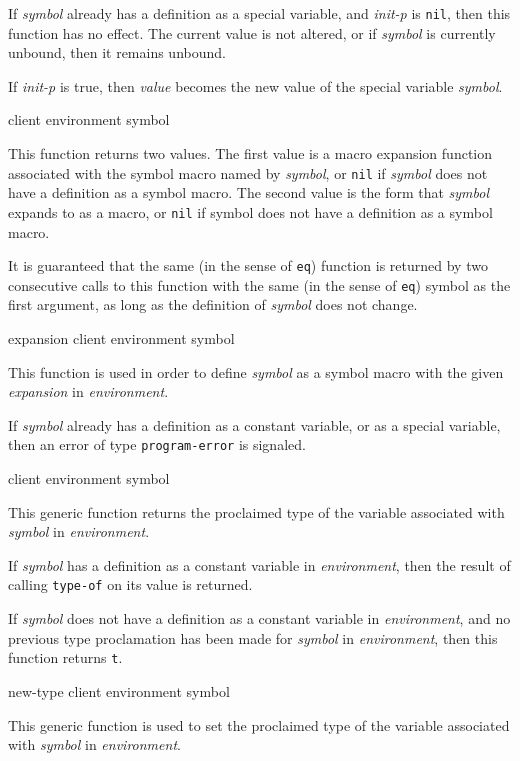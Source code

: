 If \textit{symbol} already has a definition as a special variable, and
\textit{init-p} is \texttt{nil}, then this function has no effect.
The current value is not altered, or if \textit{symbol} is currently
unbound, then it remains unbound.

If \textit{init-p} is true, then \textit{value} becomes the new value
of the special variable \textit{symbol}.

 {client environment symbol}

This function returns two values.  The first value is a macro
expansion function associated with the symbol macro named by
\textit{symbol}, or \texttt{nil} if \textit{symbol} does not have a
definition as a symbol macro.  The second value is the form that
\textit{symbol} expands to as a macro, or \texttt{nil} if symbol does
not have a definition as a symbol macro.

It is guaranteed that the same (in the sense of \texttt{eq}) function
is returned by two consecutive calls to this function with the same
(in the sense of \texttt{eq})
symbol as the first argument, as long as the definition of
\textit{symbol} does not change.

 {expansion client environment symbol}

This function is used in order to define \textit{symbol} as a symbol
macro with the given \textit{expansion} in \textit{environment}.

If \textit{symbol} already has a definition as a constant variable, or
as a special variable, then an error of type \texttt{program-error} is
signaled.

 {client environment symbol}

This generic function returns the proclaimed type of the variable
associated with \textit{symbol} in \textit{environment}.

If \textit{symbol} has a definition as a constant variable in
\textit{environment}, then the result of calling \texttt{type-of} on
its value is returned.

If \textit{symbol} does not have a definition as a constant variable
in \textit{environment}, and no previous type proclamation has been
made for \textit{symbol} in \textit{environment}, then this function
returns \texttt{t}.

 {new-type client environment symbol}

This generic function is used to set the proclaimed type of the
variable associated with \textit{symbol} in \textit{environment}.

